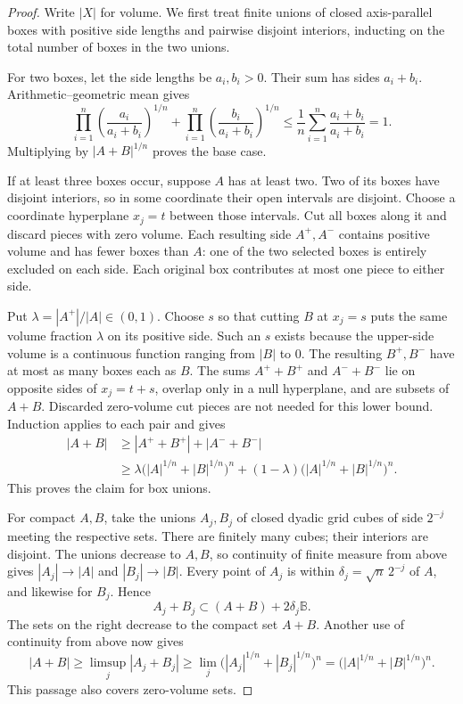 \begin{proof}
Write $|X|$ for volume. We first treat finite unions of closed axis-parallel boxes with positive side lengths and pairwise disjoint interiors, inducting on the total number of boxes in the two unions.

For two boxes, let the side lengths be $a_i,b_i>0$. Their sum has sides $a_i+b_i$. Arithmetic--geometric mean gives
\[
\prod_{i=1}^n\left(\frac{a_i}{a_i+b_i}\right)^{1/n}
+\prod_{i=1}^n\left(\frac{b_i}{a_i+b_i}\right)^{1/n}
\le\frac1n\sum_{i=1}^n\frac{a_i+b_i}{a_i+b_i}=1.
\]
Multiplying by $|A+B|^{1/n}$ proves the base case.

If at least three boxes occur, suppose $A$ has at least two. Two of its boxes have disjoint interiors, so in some coordinate their open intervals are disjoint. Choose a coordinate hyperplane $x_j=t$ between those intervals. Cut all boxes along it and discard pieces with zero volume. Each resulting side $A^+,A^-$ contains positive volume and has fewer boxes than $A$: one of the two selected boxes is entirely excluded on each side. Each original box contributes at most one piece to either side.

Put $\lambda=|A^+|/|A|\in(0,1)$. Choose $s$ so that cutting $B$ at $x_j=s$ puts the same volume fraction $\lambda$ on its positive side. Such an $s$ exists because the upper-side volume is a continuous function ranging from $|B|$ to $0$. The resulting $B^+,B^-$ have at most as many boxes each as $B$. The sums $A^++B^+$ and $A^-+B^-$ lie on opposite sides of $x_j=t+s$, overlap only in a null hyperplane, and are subsets of $A+B$. Discarded zero-volume cut pieces are not needed for this lower bound. Induction applies to each pair and gives
\[
\begin{aligned}
|A+B|&\ge|A^++B^+|+|A^-+B^-|\\
&\ge\lambda\bigl(|A|^{1/n}+|B|^{1/n}\bigr)^n
+(1-\lambda)\bigl(|A|^{1/n}+|B|^{1/n}\bigr)^n.
\end{aligned}
\]
This proves the claim for box unions.

For compact $A,B$, take the unions $A_j,B_j$ of closed dyadic grid cubes of side $2^{-j}$ meeting the respective sets. There are finitely many cubes; their interiors are disjoint. The unions decrease to $A,B$, so continuity of finite measure from above gives $|A_j|\to|A|$ and $|B_j|\to|B|$. Every point of $A_j$ is within $\delta_j=\sqrt n\,2^{-j}$ of $A$, and likewise for $B_j$. Hence
\[
A_j+B_j\subset(A+B)+2\delta_j\mathbb B.
\]
The sets on the right decrease to the compact set $A+B$. Another use of continuity from above now gives
\[
|A+B|\ge\limsup_j|A_j+B_j|
\ge\lim_j\bigl(|A_j|^{1/n}+|B_j|^{1/n}\bigr)^n
=\bigl(|A|^{1/n}+|B|^{1/n}\bigr)^n.
\]
This passage also covers zero-volume sets.
\end{proof}

